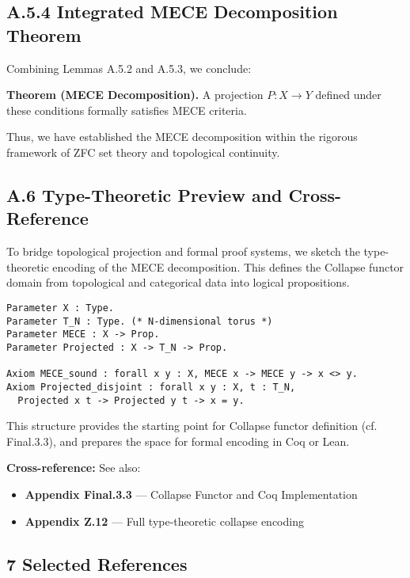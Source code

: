 \documentclass[11pt]{article}
\begin{document}
\subsection*{A.5.4 Integrated MECE Decomposition Theorem}
Combining Lemmas A.5.2 and A.5.3, we conclude:

\textbf{Theorem (MECE Decomposition).}  
A projection \( P: X \rightarrow Y \) defined under these conditions formally satisfies MECE criteria.

Thus, we have established the MECE decomposition within the rigorous framework of ZFC set theory and topological continuity.


\subsection*{A.6 Type-Theoretic Preview and Cross-Reference}

To bridge topological projection and formal proof systems, we sketch the type-theoretic encoding of the MECE decomposition.  
This defines the Collapse functor domain from topological and categorical data into logical propositions.

\begin{lstlisting}[language=Coq, caption=Type-theoretic sketch of MECE projection]
Parameter X : Type.
Parameter T_N : Type. (* N-dimensional torus *)
Parameter MECE : X -> Prop.
Parameter Projected : X -> T_N -> Prop.

Axiom MECE_sound : forall x y : X, MECE x -> MECE y -> x <> y.
Axiom Projected_disjoint : forall x y : X, t : T_N,
  Projected x t -> Projected y t -> x = y.
\end{lstlisting}

This structure provides the starting point for Collapse functor definition (cf. Final.3.3),  
and prepares the space for formal encoding in Coq or Lean.

\vspace{0.5em}

\noindent
\textbf{Cross-reference:}  
See also:
\begin{itemize}
  \item \textbf{Appendix Final.3.3} — Collapse Functor and Coq Implementation
  \item \textbf{Appendix Z.12} — Full type-theoretic collapse encoding
\end{itemize}



\subsection*{7 Selected References}
\end{document}
